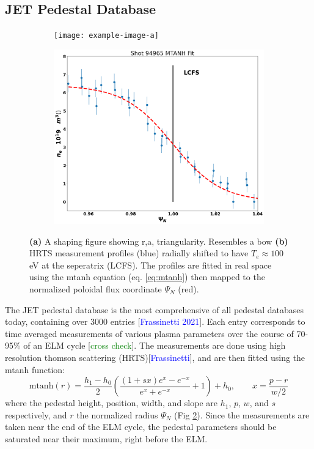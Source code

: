 \documentclass[a4paper, twoside, final, 12pt]{article}
\begin{document}
\subsection{JET Pedestal Database}
\begin{figure}
	\centering
	\begin{subfigure}{0.495\linewidth}
		\centering
		\texttt{[image: example-image-a]}
		\caption{}
		\label{subfig:triangularity}
	\end{subfigure}
	\begin{subfigure}{0.495\linewidth}
		\centering
		\includegraphics[scale=0.2]{./src/MTANH_fit}
		\caption{}
		\label{subfig:mtanhfit}
	\end{subfigure}\hfill
	\caption{ \textbf{(a)} A shaping figure showing r,a, triangularity. Resembles a bow \textbf{(b)} HRTS measurement profiles (blue) radially shifted to have $T_e \approx 100$ eV at the seperatrix (LCFS). The profiles are fitted in real space using the mtanh equation (eq. \ref{eq:mtanh}) then mapped to the normalized poloidal flux coordinate $\Psi_N$ (red).}
	\label{fig:pedestal_db_figs}
\end{figure}

The JET pedestal database is the most comprehensive of all pedestal databases today, containing over 3000 entries [\textcolor{blue}{Frassinetti 2021}].
Each entry corresponds to time averaged measurements of various plasma parameters over the course of 70-95\% of an ELM cycle [\textcolor{green}{cross check}].
The measurements are done using high resolution thomson scattering (HRTS)[\textcolor{blue}{Frassinetti}], and are then fitted using the mtanh function: 
\begin{equation} \label{eq:mtanh}
\text{mtanh}(r) = \frac{h_1 - h_0}{2} \left( \frac{(1 + sx) e^x - e^{-x}}{e^x + e^{-x}} + 1\right) + h_0 , \quad \quad x=\frac{p-r}{w/2}
\end{equation}
where the pedestal height, position, width, and slope are $h_1$, $p$, $w$, and $s$ respectively, and $r$ the normalized radius $\Psi_N$ (Fig \ref{subfig:mtanhfit}). 
Since the measurements are taken near the end of the ELM cycle, the pedestal parameters should be saturated near their maximum, right before the ELM.
\end{document}
